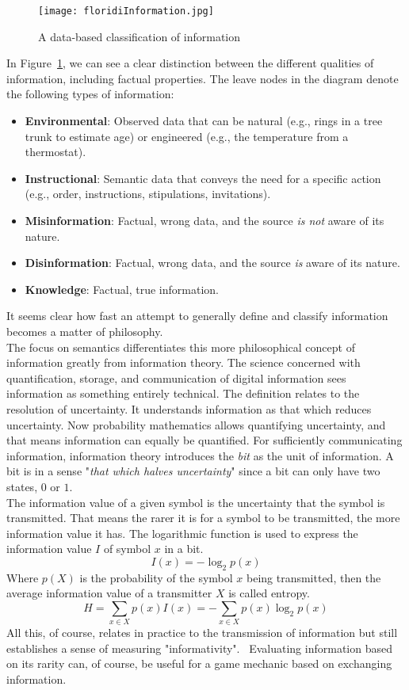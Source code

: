 \begin{figure}
	\centering
	\texttt{[image: floridiInformation.jpg]}
	\caption{A data-based classification of information~\cite{Floridi2009}}
	\label{fig:floridiInformation}
\end{figure}
In Figure~\ref{fig:floridiInformation}, we can see a clear distinction between the different qualities of information, including factual properties. The leave nodes in the diagram denote the following types of information:
\begin{itemize}
	\item \textbf{Environmental}: Observed data that can be natural (e.g., rings in a tree trunk to estimate age) or engineered (e.g., the temperature from a thermostat).
	\item \textbf{Instructional}: Semantic data that conveys the need for a specific action (e.g., order, instructions, stipulations, invitations).
	\item \textbf{Misinformation}: Factual, wrong data, and the source \textit{is not} aware of its nature.
	\item \textbf{Disinformation}: Factual, wrong data, and the source \textit{is} aware of its nature.
	\item \textbf{Knowledge}: Factual, true information.
\end{itemize}
It seems clear how fast an attempt to generally define and classify information becomes a matter of philosophy.~\cite{Floridi2009}\\
The focus on semantics differentiates this more philosophical concept of information greatly from information theory. The science concerned with quantification, storage, and communication of digital information sees information as something entirely technical. The definition relates to the resolution of uncertainty. It understands information as that which reduces uncertainty. Now probability mathematics allows quantifying uncertainty, and that means information can equally be quantified. For sufficiently communicating information, information theory introduces the \textit{bit} as the unit of information. A bit is in a sense "\textit{that which halves uncertainty}" since a bit can only have two states, $0$ or $1$.~\cite{Shannon1948}\\
The information value of a given symbol is the uncertainty that the symbol is transmitted. That means the rarer it is for a symbol to be transmitted, the more information value it has. The logarithmic function is used to express the information value $I$ of symbol $x$ in a bit.
\begin{equation}
	I(x) = -\log_2 p(x)
\end{equation}
Where $p(X)$ is the probability of the symbol $x$ being transmitted, then the average information value of a transmitter $X$ is called entropy.
\begin{equation}
	H = \sum_{x \in X} p(x)I(x) = -\sum_{x \in X} p(x)\log_2 p(x)
\end{equation}
All this, of course, relates in practice to the transmission of information but still establishes a sense of measuring "informativity".~\cite{Shannon1949} Evaluating information based on its rarity can, of course, be useful for a game mechanic based on exchanging information.
